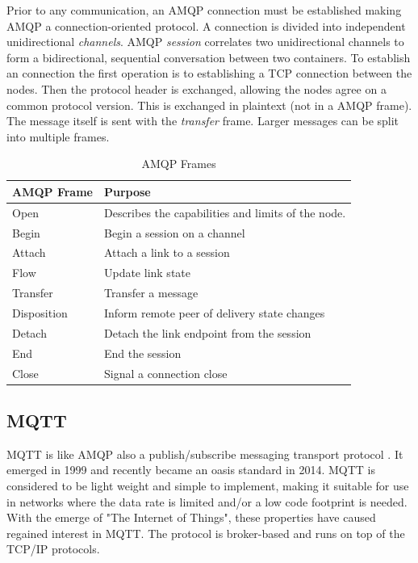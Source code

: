 Prior to any communication, an AMQP connection must be established making AMQP a
connection-oriented protocol. A connection is divided into independent
unidirectional \textit{channels}. AMQP \textit{session} correlates two
unidirectional channels to form a bidirectional, sequential conversation between
two containers. To establish an connection the first operation is to
establishing a TCP connection between the nodes. Then the protocol header is
exchanged, allowing the nodes agree on a common protocol version. This is
exchanged in plaintext (not in a AMQP frame). The message itself is sent with the
\textit{transfer} frame. Larger messages can be split into multiple frames.


\begin{table}[h]
\begin{tabularx}{\textwidth}{| X | X |}
\hline
  \textbf{AMQP Frame} & \textbf{Purpose} \\ \hline
  Open & Describes the capabilities and limits of the node. \\ \hline
  Begin & Begin a session on a channel \\ \hline
  Attach & Attach a link to a session \\ \hline
  Flow & Update link state \\ \hline
  Transfer & Transfer a message \\ \hline
  Disposition & Inform remote peer of delivery state changes \\ \hline
  Detach & Detach the link endpoint from the session \\ \hline
  End & End the session\\ \hline
  Close & Signal a connection close\\ \hline
\end{tabularx}
\caption{AMQP Frames}
\label{table-amqp-frames}
\end{table}

\subsection{MQTT}

MQTT is like AMQP also a publish/subscribe messaging transport protocol
\cite{oasis-mqtt}.  It emerged in 1999 and recently became an \gls{oasis}
standard in 2014. MQTT is considered to be light weight and simple to implement,
making it suitable for use in networks where the data rate is limited and/or a
low code footprint is needed. With the emerge of "The Internet of Things", these
properties have caused regained interest in MQTT. The protocol is broker-based
and runs on top of the TCP/IP protocols.

